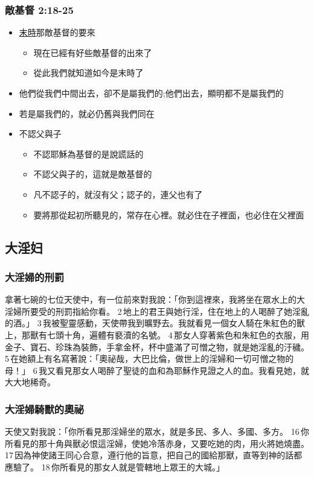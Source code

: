 \subsubsection{敵基督 2:18-25}
\begin{itemize}%
\itemsep-.5em
\item  \underline{末時}那敵基督的要來
\begin{itemize}%
\itemsep-.5em 
\item  現在已經有好些敵基督的出來了
\item  從此我們就知道如今是末時了
\end{itemize} 
\item  他們從我們中間出去，卻不是屬我們的;他們出去，顯明都不是屬我們的
\item  若是屬我們的，就必仍舊與我們同在
\item  不認父與子
\begin{itemize}%
\itemsep-.5em 
\item  不認耶穌為基督的是說謊話的
\item  不認父與子的，這就是敵基督的
\item  凡不認子的，就沒有父；認子的，連父也有了
\item  要將那從起初所聽見的，常存在心裡。就必住在子裡面，也必住在父裡面
\end{itemize}
\end{itemize}


\subsection{大淫妇}
\subsubsection{大淫婦的刑罰 }
拿著七碗的七位天使中，有一位前來對我說：「你到這裡來，我將坐在眾水上的大淫婦所要受的刑罰指給你看。 2 地上的君王與她行淫，住在地上的人喝醉了她淫亂的酒。」 3 我被聖靈感動，天使帶我到曠野去。我就看見一個女人騎在朱紅色的獸上，那獸有七頭十角，遍體有褻瀆的名號。 4 那女人穿著紫色和朱紅色的衣服，用金子、寶石、珍珠為裝飾，手拿金杯，杯中盛滿了可憎之物，就是她淫亂的汙穢。 5 在她額上有名寫著說：「奧祕哉，大巴比倫，做世上的淫婦和一切可憎之物的母！」 6 我又看見那女人喝醉了聖徒的血和為耶穌作見證之人的血。我看見她，就大大地稀奇。
\subsubsection{大淫婦騎獸的奧祕}
天使又對我說：「你所看見那淫婦坐的眾水，就是多民、多人、多國、多方。 16 你所看見的那十角與獸必恨這淫婦，使她冷落赤身，又要吃她的肉，用火將她燒盡。 17 因為神使諸王同心合意，遵行他的旨意，把自己的國給那獸，直等到神的話都應驗了。 18 你所看見的那女人就是管轄地上眾王的大城。」


